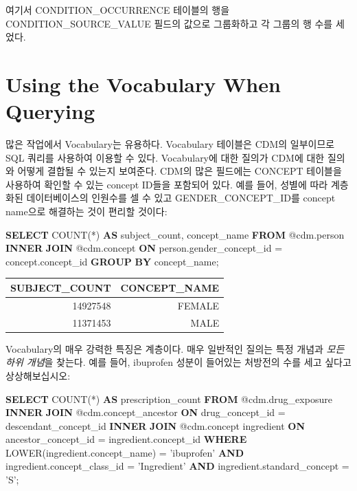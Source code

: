 \documentclass[11pt]{book}
\newenvironment{Shaded}{\begin{snugshade}}{\end{snugshade}}
\newcommand{\KeywordTok}[1]{\textcolor[rgb]{0.13,0.29,0.53}{\textbf{#1}}}
\newcommand{\StringTok}[1]{\textcolor[rgb]{0.31,0.60,0.02}{#1}}
\newcommand{\FunctionTok}[1]{\textcolor[rgb]{0.00,0.00,0.00}{#1}}
\newcommand{\NormalTok}[1]{#1}
\theoremstyle{definition}
\theoremstyle{definition}
\theoremstyle{definition}
\theoremstyle{remark}
\begin{document}
여기서 CONDITION\_OCCURRENCE 테이블의 행을 CONDITION\_SOURCE\_VALUE
필드의 값으로 그룹화하고 각 그룹의 행 수를 세었다.

\section{Using the Vocabulary When
Querying}\label{using-the-vocabulary-when-querying}

많은 작업에서 Vocabulary는 유용하다. Vocabulary 테이블은 CDM의
일부이므로 SQL 쿼리를 사용하여 이용할 수 있다. Vocabulary에 대한 질의가
CDM에 대한 질의와 어떻게 결합될 수 있는지 보여준다. CDM의 많은 필드에는
CONCEPT 테이블을 사용하여 확인할 수 있는 concept ID들을 포함되어 있다.
예를 들어, 성별에 따라 계층화된 데이터베이스의 인원수를 셀 수 있고
GENDER\_CONCEPT\_ID를 concept name으로 해결하는 것이 편리할 것이다:

\begin{Shaded}
\begin{Highlighting}[]
\KeywordTok{SELECT} \FunctionTok{COUNT}\NormalTok{(*) }\KeywordTok{AS}\NormalTok{ subject_count,}
\NormalTok{  concept_name}
\KeywordTok{FROM}\NormalTok{ @cdm.person}
\KeywordTok{INNER} \KeywordTok{JOIN}\NormalTok{ @cdm.concept}
  \KeywordTok{ON}\NormalTok{ person.gender_concept_id = concept.concept_id}
\KeywordTok{GROUP} \KeywordTok{BY}\NormalTok{ concept_name;}
\end{Highlighting}
\end{Shaded}

\begin{longtable}[]{@{}rr@{}}
\toprule
SUBJECT\_COUNT & CONCEPT\_NAME\tabularnewline
\midrule
\endhead
14927548 & FEMALE\tabularnewline
11371453 & MALE\tabularnewline
\bottomrule
\end{longtable}

Vocabulary의 매우 강력한 특징은 계층이다. 매우 일반적인 질의는 특정
개념과 \emph{모든 하위 개념}을 찾는다. 예를 들어, ibuprofen 성분이
들어있는 처방전의 수를 세고 싶다고 상상해보십시오:

\begin{Shaded}
\begin{Highlighting}[]
\KeywordTok{SELECT} \FunctionTok{COUNT}\NormalTok{(*) }\KeywordTok{AS}\NormalTok{ prescription_count}
\KeywordTok{FROM}\NormalTok{ @cdm.drug_exposure}
\KeywordTok{INNER} \KeywordTok{JOIN}\NormalTok{ @cdm.concept_ancestor}
  \KeywordTok{ON}\NormalTok{ drug_concept_id = descendant_concept_id}
\KeywordTok{INNER} \KeywordTok{JOIN}\NormalTok{ @cdm.concept ingredient}
  \KeywordTok{ON}\NormalTok{ ancestor_concept_id = ingredient.concept_id}
\KeywordTok{WHERE} \FunctionTok{LOWER}\NormalTok{(ingredient.concept_name) = }\StringTok{'ibuprofen'}
  \KeywordTok{AND}\NormalTok{ ingredient.concept_class_id = }\StringTok{'Ingredient'}
  \KeywordTok{AND}\NormalTok{ ingredient.standard_concept = }\StringTok{'S'}\NormalTok{;}
\end{Highlighting}
\end{Shaded}
\end{document}
